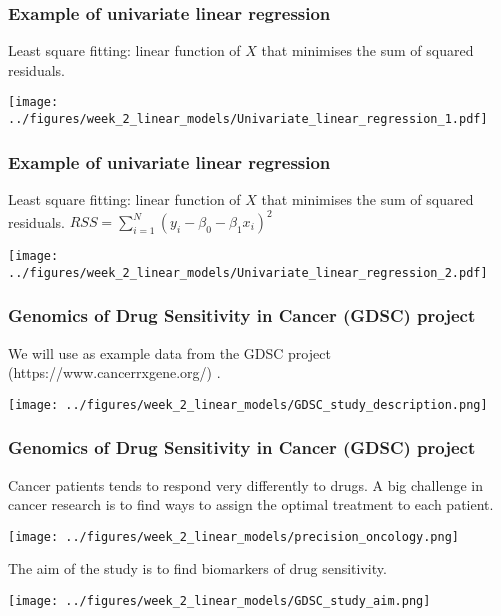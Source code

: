 \documentclass[notes]{beamer}          %
\begin{document}
\begin{frame}
\frametitle{Example of univariate linear regression}
Least square fitting: linear function of $X$ that minimises the sum of squared residuals.

\begin{center}
\texttt{[image: ../figures/week\_2\_linear\_models/Univariate\_linear\_regression\_1.pdf]}
\end{center}

\end{frame}

\begin{frame}
\frametitle{Example of univariate linear regression}
Least square fitting: linear function of $X$ that minimises the sum of squared residuals. $RSS = \sum_{i=1}^N (y_i - \beta_0 - \beta_1 x_i)^2$

\begin{center}
\texttt{[image: ../figures/week\_2\_linear\_models/Univariate\_linear\_regression\_2.pdf]}
\end{center}

\end{frame}

\begin{frame}
\frametitle{Genomics of Drug Sensitivity in Cancer (GDSC) project}
We will use as example data from the GDSC project (https://www.cancerrxgene.org/) \cite{GDSC}.

\begin{center}
\texttt{[image: ../figures/week\_2\_linear\_models/GDSC\_study\_description.png]}
\end{center}

\end{frame}

\begin{frame}
\frametitle{Genomics of Drug Sensitivity in Cancer (GDSC) project}
Cancer patients tends to respond very differently to drugs. A big challenge in cancer research 
is to find ways to assign the optimal treatment to each patient.

\begin{center}
\texttt{[image: ../figures/week\_2\_linear\_models/precision\_oncology.png]}
\end{center}

The aim of the study is to find biomarkers of drug sensitivity.

\begin{center}
\texttt{[image: ../figures/week\_2\_linear\_models/GDSC\_study\_aim.png]}
\end{center}

\end{frame}
\end{document}
